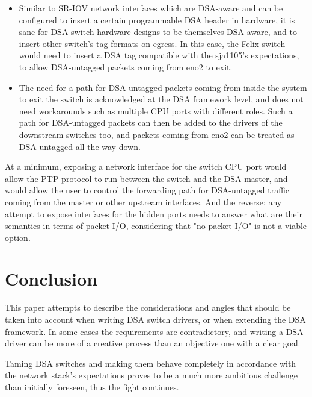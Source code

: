 \documentclass[letterpaper]{article}
\begin{document}
\begin{itemize}
\item Similar to SR-IOV network interfaces which are DSA-aware and can be
      configured to insert a certain programmable DSA header in hardware, it is
      sane for DSA switch hardware designs to be themselves DSA-aware, and to
      insert other switch's tag formats on egress. In this case, the Felix
      switch would need to insert a DSA tag compatible with the sja1105's
      expectations, to allow DSA-untagged packets coming from eno2 to exit.
\item The need for a path for DSA-untagged packets coming from inside the
      system to exit the switch is acknowledged at the DSA framework level, and
      does not need workarounds such as multiple CPU ports with different
      roles. Such a path for DSA-untagged packets can then be added to the
      drivers of the downstream switches too, and packets coming from eno2 can
      be treated as DSA-untagged all the way down.
\end{itemize}

At a minimum, exposing a network interface for the switch CPU port would allow
the PTP protocol to run between the switch and the DSA master, and would allow
the user to control the forwarding path for DSA-untagged traffic coming from
the master or other upstream interfaces. And the reverse: any attempt to expose
interfaces for the hidden ports needs to answer what are their semantics in
terms of packet I/O, considering that "no packet I/O" is not a viable option.

\section{Conclusion}

This paper attempts to describe the considerations and angles that should be
taken into account when writing DSA switch drivers, or when extending the DSA
framework. In some cases the requirements are contradictory, and writing a DSA
driver can be more of a creative process than an objective one with a clear
goal.

Taming DSA switches and making them behave completely in accordance with the
network stack's expectations proves to be a much more ambitious challenge than
initially foreseen, thus the fight continues.

\newpage
\end{document}
